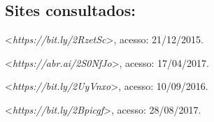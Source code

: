 \subsection{Sites consultados:}

\begin{Parskip}
\textless{}\emph{https://bit.ly/2RzetSc}\textgreater{}, acesso: 21/12/2015.

\textless{}\emph{https://abr.ai/2S0NfJo}\textgreater{}, acesso: 17/04/2017.

\textless{}\emph{https://bit.ly/2UyVnxo}\textgreater{}, acesso: 10/09/2016.

\textless{}\emph{https://bit.ly/2Bpicgf}\textgreater{}, acesso: 28/08/2017.
\end{Parskip}